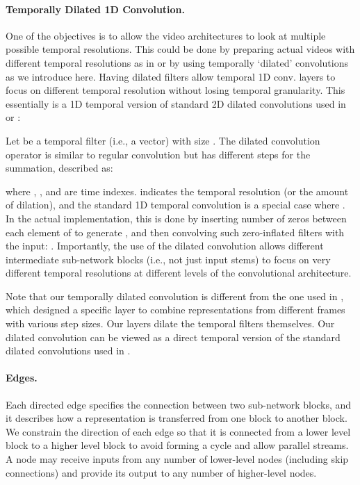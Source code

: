 \documentclass{article} \usepackage{iclr2020_conference,times}
\begin{document}
\vspace{-5pt}
\paragraph{Temporally Dilated 1D Convolution.}



One of the objectives is to allow the video architectures to look at multiple possible temporal resolutions. This could be done by preparing actual videos with different temporal resolutions as in \cite{feichtenhofer2018slowfast} or by using temporally `dilated’ convolutions as we introduce here. Having dilated filters allow temporal 1D conv. layers to focus on different temporal resolution without losing temporal granularity.  This essentially is a 1D temporal version of standard 2D dilated convolutions used in \cite{chen2018deeplab} or \cite{yu2016dilated}:

Let  be a temporal filter (i.e., a vector) with size . The dilated convolution operator  is similar to regular convolution but has different steps for the summation, described as:

where , , and  are time indexes.  indicates the temporal resolution (or the amount of dilation), and the standard 1D temporal convolution is a special case where . In the actual implementation, this is done by inserting  number of zeros between each element of  to generate , and then convolving such zero-inflated filters with the input: . Importantly, the use of the dilated convolution allows different intermediate sub-network blocks (i.e., not just input stems) to focus on very different temporal resolutions at different levels of the convolutional architecture.




Note that our temporally dilated convolution is different from the one used in \cite{lea2017temporal}, which designed a specific layer to combine representations from different frames with various step sizes. Our layers dilate the temporal filters themselves. Our dilated convolution can be viewed as a direct temporal version of the standard dilated convolutions used in \cite{chen2018deeplab,yu2016dilated}.


\vspace{-5pt}
\paragraph{Edges.}

Each directed edge specifies the connection between two sub-network blocks, and it describes how a representation is transferred from one block to another block. We constrain the direction of each edge so that it is connected from a lower level block to a higher level block to avoid forming a cycle and allow parallel streams. A node may receive inputs from any number of lower-level nodes (including skip connections) and provide its output to any number of higher-level nodes.
\end{document}
